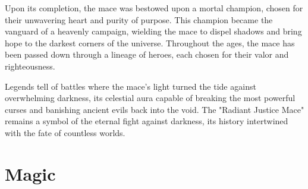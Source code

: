 Upon its completion, the mace was bestowed upon a mortal champion, chosen for their unwavering heart and purity of purpose. This champion became the vanguard of a heavenly campaign, wielding the mace to dispel shadows and bring hope to the darkest corners of the universe. Throughout the ages, the mace has been passed down through a lineage of heroes, each chosen for their valor and righteousness.

Legends tell of battles where the mace's light turned the tide against overwhelming darkness, its celestial aura capable of breaking the most powerful curses and banishing ancient evils back into the void. The "Radiant Justice Mace" remains a symbol of the eternal fight against darkness, its history intertwined with the fate of countless worlds.

\section*{Magic}
